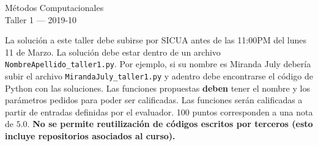 \documentclass[11pt,letterpaper]{exam}
\begin{document}
\begin{center}
{\Large Métodos Computacionales} \\
Taller 1 --- 2019-10\\

\end{center}



\vspace{0.3cm}

\noindent
La solución a este taller debe subirse por SICUA antes de las 11:00PM
del lunes 11 de Marzo.
La soluci\'on debe estar dentro de un archivo
\verb"NombreApellido_taller1.py".
Por ejemplo, si su nombre es Miranda
July deber\'ia subir el archivo \verb"MirandaJuly_taller1.py" y
adentro  debe encontrarse el c\'odigo de Python con las soluciones. 
Las funciones propuestas {\bf {deben}} tener el nombre y los
par\'ametros pedidos para poder ser calificadas. 
Las funciones ser\'an calificadas a partir de entradas definidas por
el evaluador. 100 puntos corresponden a una nota de $5.0$.
{\bf No se permite reutilizaci\'on de c\'odigos escritos por terceros (esto
incluye repositorios asociados al curso).}
\end{document}
